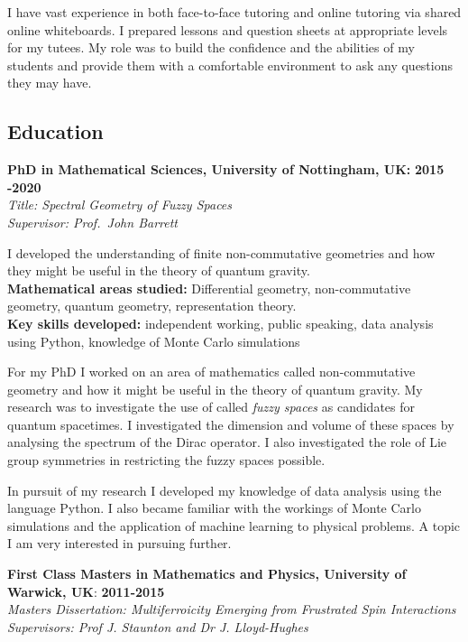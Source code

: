 \documentclass[10pt]{article}
\begin{document}
I have vast experience in both face-to-face tutoring and online tutoring
via shared online whiteboards. I prepared lessons and question sheets at
appropriate levels for my tutees. My role was to build the confidence
and the abilities of my students and provide them with a comfortable
environment to ask any questions they may have.

\subsection{Education}\label{education}

\textbf{PhD in Mathematical Sciences, University of Nottingham, UK:}
\hfill \textbf{2015 -2020}\\
\emph{Title: Spectral Geometry of Fuzzy Spaces} \\
\emph{Supervisor: Prof.~John Barrett}

I developed the understanding of finite non-commutative geometries and
how they might be useful in the theory of quantum gravity. \\
\textbf{Mathematical areas studied:} Differential geometry,
non-commutative geometry, quantum geometry, representation theory. \\
\textbf{Key skills developed:} independent working, public speaking,
data analysis using Python, knowledge of Monte Carlo simulations

For my PhD I worked on an area of mathematics called non-commutative
geometry and how it might be useful in the theory of quantum gravity. My
research was to investigate the use of called \emph{fuzzy spaces} as
candidates for quantum spacetimes. I investigated the dimension and
volume of these spaces by analysing the spectrum of the Dirac operator.
I also investigated the role of Lie group symmetries in restricting the
fuzzy spaces possible.

In pursuit of my research I developed my knowledge of data analysis
using the language Python. I also became familiar with the workings of
Monte Carlo simulations and the application of machine learning to
physical problems. A topic I am very interested in pursuing further.

\textbf{First Class Masters in Mathematics and Physics, University of
Warwick, UK}: \hfill \textbf{2011-2015}\\
\emph{Masters Dissertation: Multiferroicity Emerging from Frustrated
Spin Interactions} \\
\emph{Supervisors: Prof J. Staunton and Dr J. Lloyd-Hughes}\\
\end{document}
